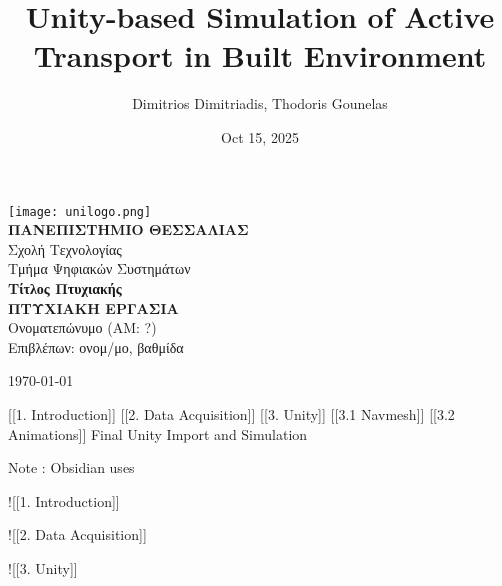 \documentclass[letterpaper,10pt,english]{jupyterBook}
\title{Unity-based Simulation of Active Transport in Built Environment}
\date{Oct 15, 2025}
\author{Dimitrios Dimitriadis, Thodoris Gounelas}
\begin{document}
\pagestyle{empty}
\begin{titlepage}
  \centering
  \vspace*{1cm}
  \texttt{[image: unilogo.png]}\\[1.5cm]
  {\fontsize{18}{22}\selectfont\textbf{ΠΑΝΕΠΙΣΤΗΜΙΟ ΘΕΣΣΑΛΙΑΣ}\\[0.5em]}
  {\large Σχολή Τεχνολογίας \\[0.5em] Τμήμα Ψηφιακών Συστημάτων \\[2em]}
  {\fontsize{24}{28}\selectfont\textbf{Τίτλος Πτυχιακής}\\[2em]}
  {\large \textbf{ΠΤΥΧΙΑΚΗ ΕΡΓΑΣΙΑ} \\[1.5em]}
  {\large Ονοματεπώνυμο (AM: ?) \\[1.5em]}
  {\large Επιβλέπων: ονομ/μο, βαθμίδα \\[2em]}
  {\large \today\par}
  \vfill
\end{titlepage}
\pagestyle{plain}
\sphinxtableofcontents
\pagestyle{normal}
\label{\detokenize{Thesis::doc}}


\sphinxAtStartPar
{}

\begin{DUlineblock}{0em}
\item[] 
\end{DUlineblock}

\sphinxAtStartPar
{[}{[}1. Introduction{]}{]}
{[}{[}2. Data Acquisition{]}{]}
{[}{[}3. Unity{]}{]}
{[}{[}3.1 Navmesh{]}{]}
{[}{[}3.2 Animations{]}{]}
Final Unity Import and Simulation

\sphinxAtStartPar
Note : Obsidian uses 

\sphinxAtStartPar
!{[}{[}1. Introduction{]}{]}

\sphinxAtStartPar
!{[}{[}2. Data Acquisition{]}{]}

\sphinxAtStartPar
!{[}{[}3. Unity{]}{]}
\end{document}
